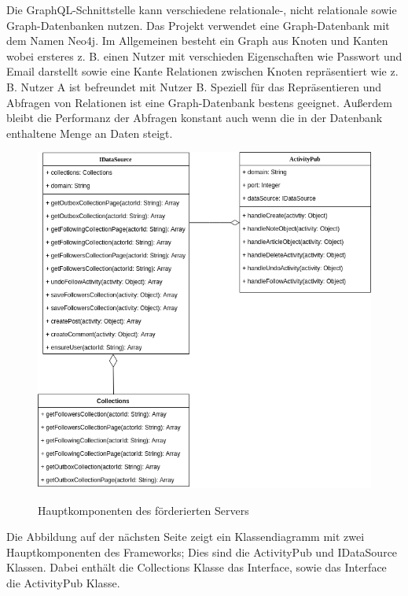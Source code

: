 Die GraphQL-Schnittstelle kann verschiedene relationale-, nicht relationale sowie Graph-Datenbanken nutzen. Das Projekt verwendet eine Graph-Datenbank mit dem Namen \glqq Neo4j\grqq. Im Allgemeinen besteht ein Graph aus Knoten und Kanten wobei ersteres z. B. einen Nutzer mit verschieden Eigenschaften wie Passwort und Email darstellt sowie eine Kante Relationen zwischen Knoten repräsentiert wie z. B. Nutzer A ist befreundet mit Nutzer B. Speziell für das Repräsentieren und Abfragen von Relationen ist eine Graph-Datenbank bestens geeignet. Außerdem bleibt die Performanz der Abfragen konstant auch wenn die in der Datenbank enthaltene Menge an Daten steigt\cite{neo4j}.\\
\begin{figure}[h]
	\begin{minipage}{\textwidth}
		\centering
		\includegraphics[scale=0.55]{figures/klassendiagramm-activitypub.png}
		\label{klassendiagramm-activitypub}
		\caption{Hauptkomponenten des förderierten Servers}
	\end{minipage}
\end{figure}
\newpage
Die Abbildung auf der nächsten Seite zeigt ein Klassendiagramm mit zwei Hauptkomponenten des Frameworks; Dies sind die ActivityPub und IDataSource Klassen. Dabei enthält die Collections Klasse das Interface, sowie das Interface die ActivityPub Klasse.\\

